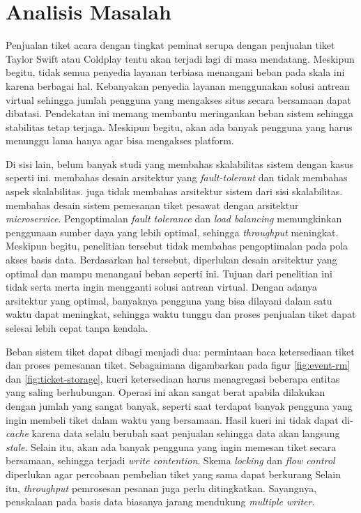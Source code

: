 \section{Analisis Masalah}

Penjualan tiket acara dengan tingkat peminat serupa dengan penjualan tiket Taylor Swift atau Coldplay tentu akan terjadi lagi di masa mendatang. Meskipun begitu, tidak semua penyedia layanan terbiasa menangani beban pada skala ini karena berbagai hal. Kebanyakan penyedia layanan menggunakan solusi antrean virtual sehingga jumlah pengguna yang mengakses situs secara bersamaan dapat dibatasi. Pendekatan ini memang membantu meringankan beban sistem sehingga stabilitas tetap terjaga. Meskipun begitu, akan ada banyak pengguna yang harus menunggu lama hanya agar bisa mengakses platform.

Di sisi lain, belum banyak studi yang membahas skalabilitas sistem dengan kasus seperti ini. \cite{microservicesEventDriven} membahas desain arsitektur yang \textit{fault-tolerant} dan tidak membahas aspek skalabilitas. \cite{backendForTicketing} juga tidak membahas arsitektur sistem dari sisi skalabilitas. \cite{barua2024enhancingresiliencescalabilitytravel} membahas desain sistem pemesanan tiket pesawat dengan arsitektur \textit{microservice}. Pengoptimalan \textit{fault tolerance} dan \textit{load balancing} memungkinkan penggunaan sumber daya yang lebih optimal, sehingga \textit{throughput} meningkat. Meskipun begitu, penelitian tersebut tidak membahas pengoptimalan pada pola akses basis data. Berdasarkan hal tersebut, diperlukan desain arsitektur yang optimal dan mampu menangani beban seperti ini. Tujuan dari penelitian ini tidak serta merta ingin mengganti solusi antrean virtual. Dengan adanya arsitektur yang optimal, banyaknya pengguna yang bisa dilayani dalam satu waktu dapat meningkat, sehingga waktu tunggu dan proses penjualan tiket dapat selesai lebih cepat tanpa kendala.

Beban sistem tiket dapat dibagi menjadi dua: permintaan baca ketersediaan tiket dan proses pemesanan tiket. Sebagaimana digambarkan pada figur \ref{fig:event-rm} dan \ref{fig:ticket-storage}, kueri ketersediaan harus menagregasi beberapa entitas yang saling berhubungan. Operasi ini akan sangat berat apabila dilakukan dengan jumlah yang sangat banyak, seperti saat terdapat banyak pengguna yang ingin membeli tiket dalam waktu yang bersamaan. Hasil kueri ini tidak dapat di-\textit{cache} karena data selalu berubah saat penjualan sehingga data akan langsung \textit{stale}. Selain itu, akan ada banyak pengguna yang ingin memesan tiket secara bersamaan, sehingga terjadi \textit{write contention}. Skema \textit{locking} dan \textit{flow control} diperlukan agar percobaan pembelian tiket yang sama dapat berkurang Selain itu, \textit{throughput} pemrosesan pesanan juga perlu ditingkatkan. Sayangnya, penskalaan pada basis data biasanya jarang mendukung \textit{multiple writer}.